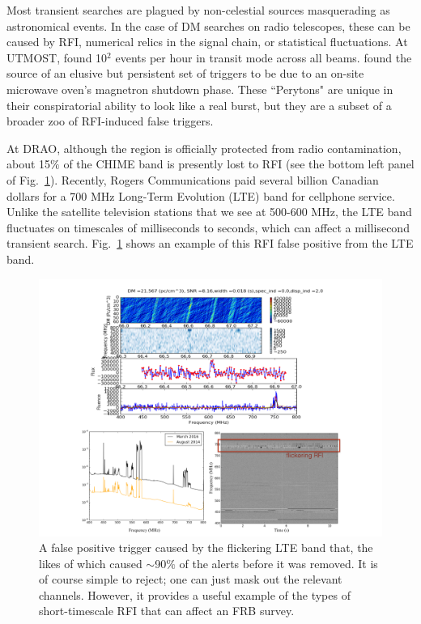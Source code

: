 Most transient searches are plagued by non-celestial sources masquerading 
as astronomical events. 
In the case of DM searches on 
radio telescopes, these can be caused by RFI, numerical relics 
in the signal chain, or statistical fluctuations. 
At UTMOST, \citet{2016MNRAS.458..718C} found 
10$^2$ events per hour in transit mode across all beams. \citet{2015MNRAS.451.3933P}
found the source of an elusive but persistent set of triggers 
to be due to an on-site microwave oven's magnetron shutdown phase. These 
``Perytons" are unique in their conspiratorial ability to 
look like a real burst, but they are a subset of a broader zoo 
of RFI-induced false triggers. 

At DRAO, although the region is officially 
protected from radio contamination, about 15$\%$ of the CHIME
band is presently lost to RFI (see the bottom left 
panel of Fig.~\ref{fig-lte_trigger}). Recently, Rogers Communications 
paid several billion Canadian dollars for a 700 MHz 
Long-Term Evolution (LTE) band for cellphone service.
Unlike the satellite television stations that we see at 500-600 MHz, 
the LTE band fluctuates on timescales of milliseconds to seconds, 
which can affect a millisecond transient search. 
Fig.~\ref{fig-lte_trigger} shows an example of this RFI false 
positive from the LTE band. 


\begin{figure}[!h]
\label{fig-lte_trigger}
\begin{center}
\includegraphics[trim={0in 0in 0in 0in}, scale=0.5]
{./figures/beamforming/lte_trigger.png}
\vspace{0.0cm}
\caption[abc]{A false positive trigger caused by the flickering 
LTE band that, the likes of which 
caused $\sim$90$\%$ of the alerts before it was removed.
It is of course simple to reject; one can just mask 
out the relevant channels.
However, it provides a useful example of the types of 
short-timescale RFI that can affect an FRB survey.}
\end{center}
\end{figure}


